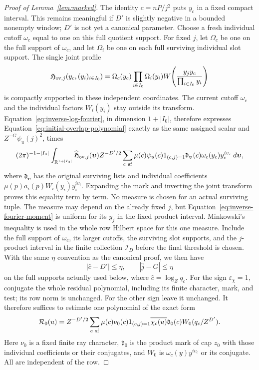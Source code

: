 \documentclass[12pt]{article}
\begin{document}
\begin{proof}[Proof of Lemma~\ref{lem:marked}]
The identity \(c=nP/j^2\) puts \(y_c\) in a fixed compact interval.
This remains meaningful if \(D'\) is slightly negative in a bounded
nonempty window; \(D'\) is not yet a canonical parameter.  Choose a
fresh individual cutoff \(\omega_c\) equal to one on this full quotient
support.  For fixed \(j\), let \(\Omega_c\) be one on the full support
of \(\omega_c\), and let \(\Omega_i\) be one on each full surviving
individual slot support.  The single joint profile
\[
 \mathfrak H_{{\rm ov},j}(y_c,(y_i)_{i\in I_0})
 =\Omega_c(y_c)\prod_{i\in I_0}\Omega_i(y_i)
 W\!\left(\frac{y_jy_c}{\prod_{i\in I_0}y_i}\right)
\]
is compactly supported in these independent coordinates.  The current
cutoff \(\omega_c\) and the individual factors \(W_i(y_i)\) stay outside
its transform.  Equation~\eqref{eq:inverse-log-fourier}, in dimension
\(1+|I_0|\), therefore expresses Equation~\eqref{eq:initial-overlap-polynomial}
exactly as the same assigned scalar and \(Z^{-G}\psi_u(j)^2\), times
\[
 (2\pi)^{-1-|I_0|}\int_{\mathbb R^{1+|I_0|}}
 \widehat{\mathfrak H}_{{\rm ov},j}(\boldsymbol\upsilon)
 Z^{-D'/2}\sum_{c\ {\rm sf}}\mu(c)\psi_u(c)1_{(c,j)=1}
 \mathfrak d_{\boldsymbol\upsilon}(c)
 \omega_c(y_c)y_c^{i\upsilon_c}\,d\boldsymbol\upsilon,
\]
where \(\mathfrak d_{\boldsymbol\upsilon}\) has the original surviving
lists and individual coefficients
\(\mu(p)a_i(p)W_i(y_i)y_i^{i\upsilon_i}\).  Expanding the mark and
inverting the joint transform proves this equality term by term.
No measure is chosen for an actual surviving tuple.  The measure may
depend on the already fixed \(j\), but Equation~\eqref{eq:inverse-fourier-moment}
is uniform for its \(y_j\) in the fixed product interval.  Minkowski's
inequality is used in the whole row Hilbert space for this one measure.
Include the full support of \(\omega_c\), its larger cutoffs, the
surviving slot supports, and the \(j\)-product interval in the finite
collection \(\mathcal I_D\) before the final threshold is chosen.
With the same \(\eta\) convention as the canonical proof, we then have
\[
 |\widehat c-D'|\le\eta,\qquad |\widehat j-G|\le\eta
\]
on the full supports actually used below, where \(\widehat c=\log_Zq_c\).
For the sign
\(\varepsilon_\chi=1\), conjugate the whole residual polynomial,
including its finite character, mark, and test; its row norm is unchanged.
For the other sign leave it unchanged.  It therefore suffices to estimate
one polynomial of the exact form
\begin{equation}\label{eq:initial-residual-polynomial}
 \mathcal R_0(u)=Z^{-D'/2}\sum_{c\ {\rm sf}}
 \mu(c)\nu_0(c)1_{(c,j)=1}\overline{\chi_c(u)}
 \mathfrak d_0(c)W_0(q_c/Z^{D'}).
\end{equation}
Here \(\nu_0\) is a fixed finite ray character, \(\mathfrak d_0\)
is the product mark of cap \(z_0\) with those individual coefficients
or their conjugates, and \(W_0\) is \(\omega_c(y)y^{i\upsilon_c}\)
or its conjugate.  All are independent of the row.


\end{proof}
\end{document}
